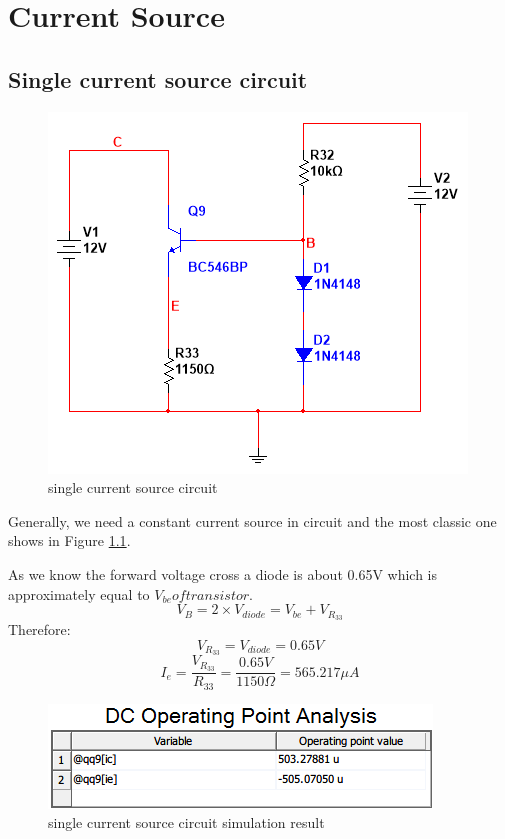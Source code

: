 \chapter{Current Source}
\section{Single current source circuit}



\begin{figure}[htbp]
\centering
\includegraphics[scale =0.6]{"../Photo/Chap3/single current source"}
\caption{single current source circuit}
\label{fig:singlecurrentsource}
\end{figure}

Generally, we need a constant current source in circuit and the most classic one shows in Figure \ref{fig:singlecurrentsource}.

As we know the forward voltage cross a diode is about 0.65V which is approximately equal to $ V_{be} of transistor $. 
\[ V_B = 2 \times V_{diode} = V_{be} + V_{R_{33}}  \]   
Therefore:
\[  V_{R_{33}} = V_{diode} = 0.65V \] 
\[ I_e = \frac{V_{R_{33}}}{R_{33}} = \frac{0.65V}{1150 \Omega} = 565.217 \mu A \]

\begin{figure}[htbp]
\centering
\includegraphics[scale=0.8]{"../Photo/Chap3/single current source simulation result"}
\caption{single current source circuit simulation result}
\label{fig:singlecurrentsourcesimulationresult}
\end{figure}

